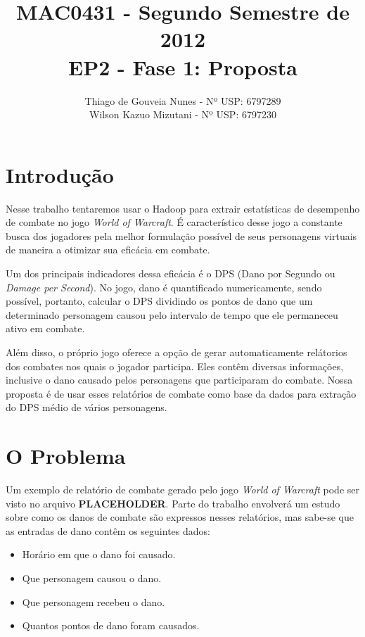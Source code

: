 \documentclass[a4paper,11pt]{article}
\title{MAC0431 - Segundo Semestre de 2012 \\
       EP2 - Fase 1: Proposta}
\author{Thiago de Gouveia Nunes - Nº USP: 6797289 \\
        Wilson Kazuo Mizutani - Nº USP: 6797230}
\begin{document}
\maketitle

\section{Introdução}

  Nesse trabalho tentaremos usar o Hadoop para extrair estatísticas de
  desempenho de combate no jogo \textit{World of Warcraft}. É característico
  desse jogo a constante busca dos jogadores pela melhor formulação possível de
  seus personagens virtuais de maneira a otimizar sua eficácia em combate.
  
  Um dos principais indicadores dessa eficácia é o DPS (Dano por Segundo ou
  \textit{Damage per Second}). No jogo, dano é quantificado numericamente, sendo
  possível, portanto, calcular o DPS dividindo os pontos de dano que um
  determinado personagem causou pelo intervalo de tempo que ele permaneceu ativo
  em combate.
  
  Além disso, o próprio jogo oferece a opção de gerar automaticamente relátorios
  dos combates nos quais o jogador participa. Eles contêm diversas informações,
  inclusive o dano causado pelos personagens que participaram do combate.
  Nossa proposta é de usar esses relatórios de combate como base da dados para
  extração do DPS médio de vários personagens.

\section{O Problema}

  Um exemplo de relatório de combate gerado pelo jogo \textit{World of Warcraft}
  pode ser visto no arquivo \textbf{\LARGE{PLACEHOLDER}}. Parte do trabalho
  envolverá um estudo sobre como os danos de combate são expressos nesses
  relatórios, mas sabe-se que as entradas de dano contêm os seguintes dados:
  
  \begin{itemize}
  
    \item Horário em que o dano foi causado.
    \item Que personagem causou o dano.
    \item Que personagem recebeu o dano.
    \item Quantos pontos de dano foram causados.
  
  \end{itemize}
  
\end{document}
